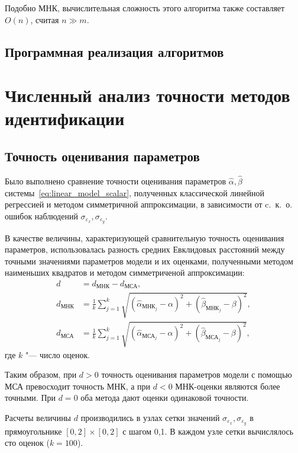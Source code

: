 Подобно МНК, вычислительная сложность этого алгоритма также составляет \( O(n) \),
считая \( n \gg m \).

\subsection{Программная реализация алгоритмов}



\section{Численный анализ точности методов идентификации}

\subsection{Точность оценивания параметров}

Было выполнено сравнение точности оценивания параметров
\( \hat{\alpha}, \hat{\beta} \) системы~\eqref{eq:linear_model_scalar},
полученных классической линейной регрессией и методом симметричной аппроксимации,
в зависимости от c.~к.~о. ошибок наблюдений \( \sigma_{\varepsilon_x}, \sigma_{\varepsilon_y} \).

В качестве величины, характеризующей сравнительную точность оценивания параметров,
использовалась разность средних Евклидовых расстояний
между точными значениями параметров модели и их оценками,
полученными методом наименьших квадратов и методом симметриченой аппроксимации:
\begin{equation*}
  \begin{aligned}
    d &= d_{\text{МНК}} - d_{\text{МСА}}, \\
    d_{\text{МНК}} &= \frac{1}{k} \sum_{j=1}^k \sqrt{(\hat{\alpha}_{\text{МНК}_j} - \alpha)^2 + (\hat{\beta}_{\text{МНК}_j} - \beta)^2}, \\
    d_{\text{МСА}} &= \frac{1}{k} \sum_{j=1}^k \sqrt{(\hat{\alpha}_{\text{МСА}_j} - \alpha)^2 + (\hat{\beta}_{\text{МСА}_j} - \beta)^2},
  \end{aligned}
\end{equation*}
где \( k \) "--- число оценок.

{\color{red}
Таким образом, при \( d > 0 \) точность оценивания параметров модели с помощью МСА
превосходит точность МНК, а при \( d < 0 \) МНК-оценки являются более точными.
При \( d = 0 \) оба метода дают оценки одинаковой точности.
}

Расчеты величины \( d \) производились в узлах сетки значений
\( \sigma_{\varepsilon_x}, \sigma_{\varepsilon_y} \) в прямоугольнике
\( [0, 2] \times [0, 2] \) с шагом 0{,}1.
В каждом узле сетки вычислялось сто оценок (\( k = 100 \)).

